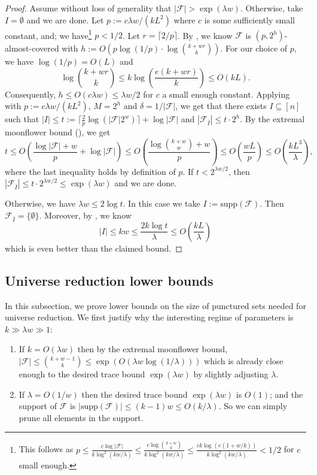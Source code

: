 \documentclass{article}
\newcommand{\<}{\langle}
\renewcommand{\>}{\rangle}
\newcommand{\calF}{\mathcal{F}}
\newcommand{\supp}{\mathrm{supp}}
\begin{document}
\begin{proof}
    Assume without loss of generality that $|\calF| > \exp (\lambda w)$. Otherwise, take $I = \emptyset$ and we are done. Let $p:= c \lambda w / (k L^2)$ where $c$ is some sufficiently small constant, and; we have\footnote{This follows as $p \le \frac{c \log |\calF|}{k \log^2 (kw/\lambda)} \le \frac{c \log \binom{k+w}{k}}{k \log^2 (kw/\lambda)}\leq \frac{c k \log (e(1 + w/k))}{k \log^2 (kw/\lambda)} < 1/2$ for $c$ small enough.} $p < 1/2$. Let $r = \lceil 2/p \rceil$.
    By , we know $\calF$ is $(p, 2^h)$-almost-covered with $h:= O( p \log(1/p) \cdot \log \binom{k+wr}{k})$. For our choice of $p$, we have $\log (1/p) = O(L)$  and
    \[
    \log \binom{k + wr}{k} \leq k \log \left(\frac{e(k+wr)}{k}\right) \leq O(k L).
    \]
    Consequently, $h \leq O(c\lambda w) \leq \lambda w / 2$ for $c$ a small enough constant. Applying  with $p:= c \lambda w / (k L^2)$, $M = 2^h$ and $\delta = 1/|\calF|$, we get that there exists $I \subseteq [n]$ such that $|I| \leq t:= \lceil \frac{2}{p}\log(|\calF|2^w)\rceil + \log |\calF|$ and $|\calF_{\bar{I}}| \leq t \cdot 2^h$. By the extremal moonflower bound (), we get
    \[
    t \leq O \left(\frac{\log |\calF| + w}{p} + \log |\calF|\right) \leq O \left(\frac{\log \binom{k+w}{w} + w}{p}\right) \leq O\left(\frac{w L}{p}\right) \leq O\left( \frac{k L^3}{\lambda} \right),
    \]
    where the last inequality holds by definition of $p$.
    If $t < 2^{\lambda w / 2}$, then $|\calF_{\bar{I}}| \leq t \cdot 2^{\lambda w / 2} \leq \exp (\lambda w)$ and we are done. 

    Otherwise, we have $\lambda w \leq 2 \log t$. In this case we take $I:= \supp (\calF)$. Then $\calF_{\bar{I}} = \{\emptyset\}$. Moreover, by , we know
    \[
        |I| \leq kw \leq \frac{2k \log t}{\lambda} \leq O\left(\frac{kL}{\lambda}\right) 
    \]
    which is even better than the claimed bound.
\end{proof}

\subsection{Universe reduction lower bounds}\label{subsec:universe_reduction_LB}
In this subsection, we prove lower bounds on the size of punctured sets needed for universe reduction. We first justify why the interesting regime of parameters is $k \gg \lambda w \gg 1$:
\begin{enumerate}
    \item If $k=O(\lambda w)$ then by the extremal moonflower bound, $|\calF| \le {k+w-1 \choose k} \le \exp(O(\lambda w \log(1/\lambda)))$ which is already close enough to the desired trace bound $\exp(\lambda w)$ by slightly adjusting $\lambda$.
    \item If $\lambda=O(1/w)$ then the desired trace bound $\exp(\lambda w)$ is $O(1)$; and the support of $\calF$ is $|\supp(\calF)|\le (k-1)w \le O(k/\lambda)$. So we can simply prune all elements in the support.
\end{enumerate}
\end{document}
